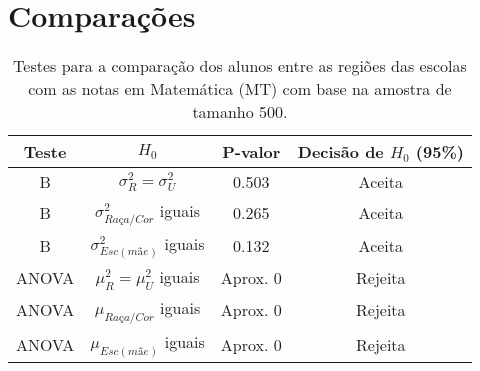 

\chapter{Comparações\label{cap_normal}}
\begin{table}[htb]
\caption{\label{teste_MT}Testes para a comparação dos alunos entre as regiões das escolas com as notas em Matemática (MT) com base na amostra de tamanho 500.}
    \centering
    \begin{tabular}{cccc}
    \toprule
    Teste & $H_0$& P-valor & Decisão de $H_0$ (95\%)\\
    \midrule \midrule
    B & $\sigma_R^2 = \sigma_U^2$ & 0.503 & Aceita\\
    B & $\sigma_{Raça/Cor}^2$ iguais & 0.265 & Aceita\\
    B & $\sigma_{Esc(mãe)}^2$ iguais & 0.132 & Aceita\\
    ANOVA & $\mu_R^2 = \mu_U^2$ iguais & Aprox. 0 & Rejeita\\
    ANOVA & $\mu_{Raça/Cor}$ iguais & Aprox. 0 & Rejeita\\
    ANOVA & $\mu_{Esc(mãe)}$ iguais & Aprox. 0 & Rejeita\\
    \bottomrule
    \end{tabular}
\end{table}


